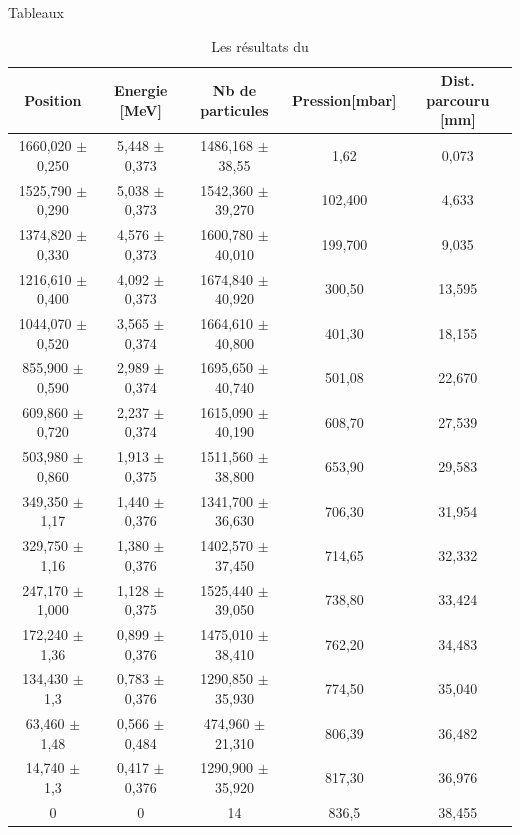 \documentclass[a4paper,11pt,liststotocnumbered,bibtotocnumbered]{scrartcl}
\begin{document}
 \begin{appendix}
  
    

  \listoffigures  

  \begin{section}{Tableaux}

   \begin{table}[H]
    \begin{center}
     \begin{tabular}{c|c|c|c|c}
      Position	&Energie [MeV]	&Nb de particules	&Pression[mbar]	&Dist. parcouru [mm]\\ \hline
      1660,020 $\pm$ 0,250	&5,448 $\pm$ 0,373	&1486,168 $\pm$ 38,55	&1,62	&0,073\\		
      1525,790 $\pm$ 0,290	&5,038 $\pm$ 0,373	&1542,360 $\pm$ 39,270	&102,400	&4,633\\
      1374,820 $\pm$ 0,330	&4,576 $\pm$ 0,373	&1600,780 $\pm$ 40,010	&199,700	&9,035\\
      1216,610 $\pm$ 0,400	&4,092 $\pm$ 0,373	&1674,840 $\pm$ 40,920	&300,50	&13,595\\
      1044,070 $\pm$ 0,520	&3,565 $\pm$ 0,374	&1664,610 $\pm$ 40,800	&401,30	&18,155\\
      855,900 $\pm$ 0,590	&2,989 $\pm$ 0,374	&1695,650 $\pm$ 40,740	&501,08	&22,670\\
      609,860 $\pm$ 0,720	&2,237 $\pm$ 0,374	&1615,090 $\pm$ 40,190	&608,70	&27,539\\
      503,980 $\pm$ 0,860	&1,913 $\pm$ 0,375	&1511,560 $\pm$ 38,800	&653,90	&29,583\\
      349,350 $\pm$ 1,17	&1,440 $\pm$ 0,376	&1341,700 $\pm$ 36,630	&706,30	&31,954\\
      329,750 $\pm$ 1,16	&1,380 $\pm$ 0,376	&1402,570 $\pm$ 37,450	&714,65	&32,332\\
      247,170 $\pm$ 1,000	&1,128 $\pm$ 0,375	&1525,440 $\pm$ 39,050	&738,80	&33,424\\
      172,240 $\pm$ 1,36	&0,899 $\pm$ 0,376	&1475,010 $\pm$ 38,410	&762,20	&34,483\\
      134,430 $\pm$ 1,3		&0,783 $\pm$ 0,376	&1290,850 $\pm$ 35,930	&774,50	&35,040\\
      63,460 $\pm$ 1,48		&0,566 $\pm$ 0,484	&474,960 $\pm$ 21,310	&806,39	&36,482\\
      14,740 $\pm$ 1,3		&0,417 $\pm$ 0,376	&1290,900 $\pm$ 35,920	&817,30	&36,976\\
      0				&0 	&14			&836,5	&38,455\\
     \end{tabular}
    \caption{\label{tabelle-am} Les résultats du  }
    \end{center}
   \end{table}


\end{section}
\end{appendix}
\end{document}
